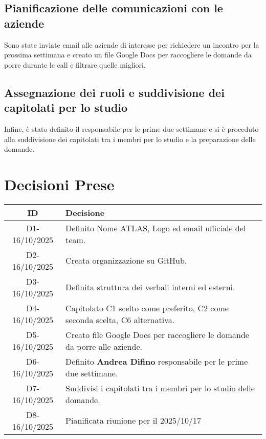\documentclass[a4paper,12pt]{article}
\begin{document}
{        \subsection{Pianificazione delle comunicazioni con le aziende}{
        Sono state inviate email alle aziende di interesse per richiedere un incontro per la prossima settimana e creato un file Google Docs per raccogliere le domande da porre durante le call e filtrare quelle migliori.  
        
        }

        \subsection{Assegnazione dei ruoli e suddivisione dei capitolati per lo studio}{
        Infine, è stato definito il responsabile per le prime due settimane e si è proceduto alla suddivisione dei capitolati tra i membri per lo studio e la preparazione delle domande.
        }


}


\section{Decisioni Prese}{
    \begin{center}
    \begin{tabular}{|c|p{11cm}|}
        \hline
        \textbf{ID} & \textbf{Decisione} \\
        \hline
        D1-16/10/2025 & Definito Nome ATLAS, Logo ed email ufficiale del team. \\
        \hline
        D2-16/10/2025 & Creata organizzazione su GitHub. \\
        \hline
        D3-16/10/2025 & Definita struttura dei verbali interni ed esterni. \\
        \hline
        D4-16/10/2025 & Capitolato C1 scelto come preferito, C2 come seconda scelta, C6 alternativa. \\
        \hline
        D5-16/10/2025 & Creato file Google Docs per raccogliere le domande da porre alle aziende. \\
        \hline
        D6-16/10/2025 & Definito \textbf{Andrea Difino} responsabile per le prime due settimane. \\
        \hline
        D7-16/10/2025 & Suddivisi i capitolati tra i membri per lo studio delle domande. \\
        \hline
        D8-16/10/2025 & Pianificata riunione per il 2025/10/17 \\
        \hline
    \end{tabular}
    \end{center}
}
\end{document}
